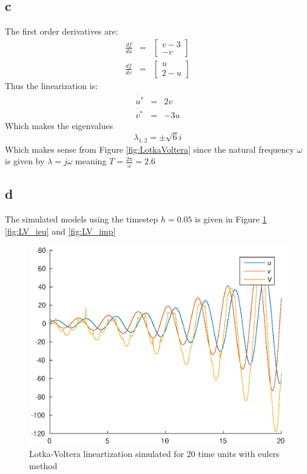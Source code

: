 \documentclass[11pt]{article}
\begin{document}
\subsection*{c}
The first order derivatives are:
\begin{eqnarray*}
\frac{df}{du} &=& \begin{bmatrix} v-3 \\ -v \end{bmatrix} \\
\frac{df}{dv} &=& \begin{bmatrix} u \\ 2-u \end{bmatrix} 
\end{eqnarray*}
Thus the linearization is:
\begin{eqnarray*}
\dot{u^*} &=&  2v \\
\dot{v^*} &=& -3u
\end{eqnarray*}
Which makes the eigenvalues
\[\lambda_{1,2} = \pm \sqrt{6} i \]
Which makes sense from Figure \ref{fig:LotkaVoltera} since the natural frequency $\omega$ is given by $\lambda = j\omega$ meaning $T = \frac{2 \pi}{\omega} = 2.6$

\subsection*{d}
The simulated models using the timestep $h = 0.05$ is given in Figure \ref{fig:LV_eeu} \ref{fig:LV_ieu} and \ref{fig:LV_imp}

\begin{figure}[h!]
\centering
\includegraphics[width=.8\textwidth]{LV_eeu.eps}
\caption{Lotka-Voltera lineartization simulated for 20 time units with eulers method}
\label{fig:LV_eeu}
\end{figure}
\end{document}
